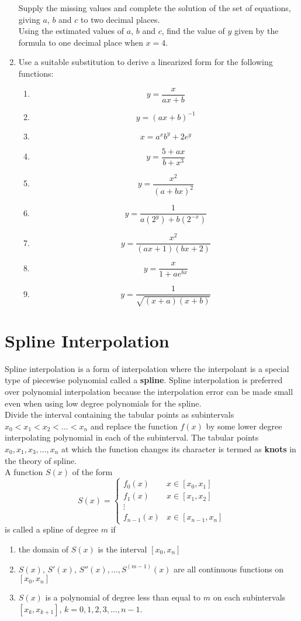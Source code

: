 \documentclass[12pt,class=book,crop=false]{standalone}
\begin{document}
\begin{enumerate}
	      Supply the missing values and complete the solution of the set of equations, giving $ a $, $ b $ and $ c $ to two decimal places.\\
	      Using the estimated values of $ a $, $ b $ and $ c $, find the value of $ y $ given by the formula to one decimal place when $ x = 4 $.
	\item Use a suitable substitution to derive a linearized form for the following functions:
	      \begin{enumerate}[label=(\roman*)]
		      \item \[y=\frac{x}{ax+b}\]
		      \item \[y=(ax+b)^{-1}\]
		      \item \[x=a^x b^y+2e^y\]
		      \item \[y=\frac{5+ax}{b+x^3}\]
		      \item \[y =\frac{x^2}{(a+bx)^2}\]
		      \item \[y=\frac{1}{a(2^y)+b(2^{-x})}\]
		      \item \[y=\frac{x^2}{(ax+1)(bx+2)}\]
		      \item \[y=\frac{x}{1+ae^{bx} }\]
		      \item \[y=\frac{1}{\sqrt{(x+a)(x+b)}}\]
	      \end{enumerate}
\end{enumerate}
\section{Spline Interpolation}
Spline interpolation is a form of interpolation where the interpolant is a special type of  piecewise polynomial called a \textbf{spline}. Spline interpolation is preferred over polynomial interpolation because the interpolation error can be made small even when using low degree polynomials for the spline.\\
Divide the interval containing the tabular points as subintervals 	$ x_0<x_1<x_2<\dots<x_n  $ and replace the function $ f(x) $ by some lower degree interpolating polynomial in each of the subinterval. The tabular points $ x_0, x_1, x_3,\dots, x_n   $ at which the function changes its character is termed as \textbf{knots} in the theory of spline.\\


A function $ S(x) $ of the form
\[
	S(x)=\begin{cases}
		f_0 (x)     & x\in [x_0,x_1]    \\
		f_1 (x)     & x\in [x_1,x_2]    \\
		\vdots      &                   \\
		f_{n-1} (x) & x\in[x_{n-1},x_n]
	\end{cases}
\]
is called a spline of degree $ m $ if
\begin{enumerate}[label=(\roman*)]
	\item the domain of $ S(x) $ is the interval $ [x_0,x_n] $
	\item $ S(x),\, S'(x),\, S''(x),\dots, S^{(m-1)} (x) $ are all continuous functions on $ [x_0, x_n] $
	\item $ S(x) $ is a polynomial of degree less than equal to $ m $ on each subintervals $ [x_k, x_{k+1}]$, $k=0,1,2,3,\dots,n-1 $.
\end{enumerate}
\end{document}
